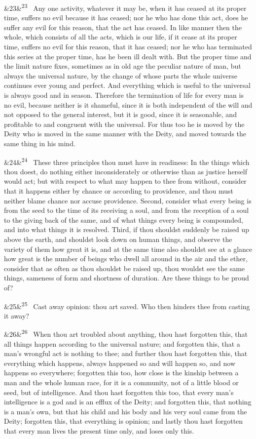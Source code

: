 \documentclass[12pt]{article}
\newcommand{\para}[1][]{\par\noindent\ifx&#1&\else\textsuperscript{\footnotesize #1}~\fi}
\begin{document}
\para[23] Any one activity, whatever it may be, when it has ceased at its
proper time, suffers no evil because it has ceased; nor he who has done
this act, does he suffer any evil for this reason, that the act has
ceased. In like manner then the whole, which consists of all the acts,
which is our life, if it cease at its proper time, suffers no evil for
this reason, that it has ceased; nor he who has terminated this series
at the proper time, has he been ill dealt with. But the proper time and
the limit nature fixes, sometimes as in old age the peculiar nature of
man, but always the universal nature, by the change of whose parts the
whole universe continues ever young and perfect. And everything which
is useful to the universal is always good and in season. Therefore the
termination of life for every man is no evil, because neither is it
shameful, since it is both independent of the will and not opposed to
the general interest, but it is good, since it is seasonable, and
profitable to and congruent with the universal. For thus too he is moved
by the Deity who is moved in the same manner with the Deity, and moved
towards the same thing in his mind.

\para[24] These three principles thou must have in readiness: In the things
which thou doest, do nothing either inconsiderately or otherwise than as
justice herself would act; but with respect to what may happen to thee
from without, consider that it happens either by chance or according to
providence, and thou must neither blame chance nor accuse providence.
Second, consider what every being is from the seed to the time of its
receiving a soul, and from the reception of a soul to the giving back of
the same, and of what things every being is compounded, and into what
things it is resolved. Third, if thou shouldst suddenly be raised up
above the earth, and shouldst look down on human things, and observe the
variety of them how great it is, and at the same time also shouldst see
at a glance how great is the number of beings who dwell all around in
the air and the ether, consider that as often as thou shouldst be raised
up, thou wouldst see the same things, sameness of form and shortness of
duration. Are these things to be proud of?

\para[25] Cast away opinion: thou art saved. Who then hinders thee from
casting it away?

\para[26] When thou art troubled about anything, thou hast forgotten this,
that all things happen according to the universal nature; and forgotten
this, that a man's wrongful act is nothing to thee; and further thou
hast forgotten this, that everything which happens, always happened so
and will happen so, and now happens so everywhere; forgotten this too,
how close is the kinship between a man and the whole human race, for it
is a community, not of a little blood or seed, but of intelligence. And
thou hast forgotten this too, that every man's intelligence is a god and
is an efflux of the Deity; and forgotten this, that nothing is a
man's own, but that his child and his body and his very soul came from
the Deity; forgotten this, that everything is opinion; and lastly thou
hast forgotten that every man lives the present time only, and loses
only this.
\end{document}
